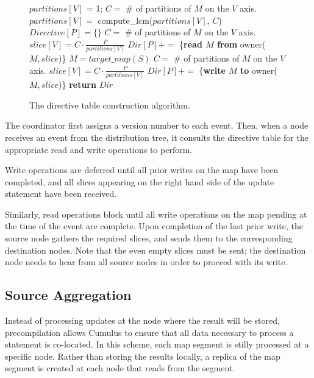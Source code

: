 \documentclass{vldb}
\begin{document}
\begin{figure}
\begin{algorithmic}[1]
  \STATE $partitions[V]$ = 1;
    \STATE {}
    \STATE $C =$ \# of partitions of $M$ on the $V$ axis.
    \STATE $partitions[V] =$ compute\_lcm($partitions[V]$, $C$)
  \ENDFOR
\ENDFOR
{}
  \STATE $Directive[P] = \{\}$
      \STATE $C =$ \# of partitions of $M$ on the $V$ axis.
      \STATE $slice[V] = C\cdot\frac{P}{partitions[V]}$
    \ENDFOR
    \STATE {}
    \STATE $Dir[P] +=$ \{\textbf{read $M$ from} owner($M, slice$)\}
  \ENDFOR
  \STATE $M = target\_map(S)$
    \STATE $C =$ \# of partitions of $M$ on the $V$ axis.
    \STATE $slice[V] = C\cdot\frac{P}{partitions[V]}$
  \ENDFOR
  \STATE $Dir[P] +=$ \{\textbf{write $M$ to} owner($M, slice$)\}
\ENDFOR
\STATE \textbf{return} $Dir$
\end{algorithmic}
\caption{The directive table construction algorithm.}
\label{fig:directiveconstruction}
\end{figure}

The coordinator first assigns a version number to each event.  Then, when a node receives an event from the distribution tree, it consults the directive table for the appropriate read and write operations to perform.  

Write operations are deferred until all prior writes on the map have been completed, and all slices appearing on the right hand side of the update statement have been received.  

Similarly, read operations block until all write operations on the map pending at the time of the event are complete.  Upon completion of the last prior write, the source node gathers the required slices, and sends them to the corresponding destination nodes.  Note that the even empty slices must be sent; the destination node needs to hear from all source nodes in order to proceed with its write.

\subsection{Source Aggregation}
Instead of processing updates at the node where the result will be stored, precompilation allows Cumulus to ensure that all data necessary to process a statement is co-located. In this scheme, each map segment is stilly processed at a specific node.  Rather than storing the results locally, a replica of the map segment is created at each node that reads from the segment.  
\end{document}
